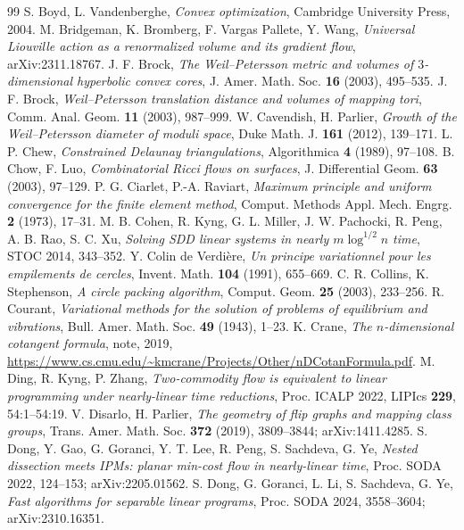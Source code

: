 \documentclass[11pt]{amsart}
\theoremstyle{definition}
\theoremstyle{remark}
\begin{document}
\begin{thebibliography}{99}
 S. Boyd, L. Vandenberghe, \emph{Convex optimization}, Cambridge University Press, 2004.
 M. Bridgeman, K. Bromberg, F. Vargas Pallete, Y. Wang, \emph{Universal Liouville action as a renormalized volume and its gradient flow}, arXiv:2311.18767.
 J. F. Brock, \emph{The Weil--Petersson metric and volumes of $3$-dimensional hyperbolic convex cores}, J. Amer. Math. Soc. \textbf{16} (2003), 495--535.
 J. F. Brock, \emph{Weil--Petersson translation distance and volumes of mapping tori}, Comm. Anal. Geom. \textbf{11} (2003), 987--999.
 W. Cavendish, H. Parlier, \emph{Growth of the Weil--Petersson diameter of moduli space}, Duke Math. J. \textbf{161} (2012), 139--171.
 L. P. Chew, \emph{Constrained Delaunay triangulations}, Algorithmica \textbf{4} (1989), 97--108.
 B. Chow, F. Luo, \emph{Combinatorial Ricci flows on surfaces}, J. Differential Geom. \textbf{63} (2003), 97--129.
 P. G. Ciarlet, P.-A. Raviart, \emph{Maximum principle and uniform convergence for the finite element method}, Comput. Methods Appl. Mech. Engrg. \textbf{2} (1973), 17--31.
 M. B. Cohen, R. Kyng, G. L. Miller, J. W. Pachocki, R. Peng, A. B. Rao, S. C. Xu, \emph{Solving SDD linear systems in nearly $m\log^{1/2}n$ time}, STOC 2014, 343--352.
 Y. Colin de Verdi\`ere, \emph{Un principe variationnel pour les empilements de cercles}, Invent. Math. \textbf{104} (1991), 655--669.
 C. R. Collins, K. Stephenson, \emph{A circle packing algorithm}, Comput. Geom. \textbf{25} (2003), 233--256.
 R. Courant, \emph{Variational methods for the solution of problems of equilibrium and vibrations}, Bull. Amer. Math. Soc. \textbf{49} (1943), 1--23.
 K. Crane, \emph{The $n$-dimensional cotangent formula}, note, 2019, \url{https://www.cs.cmu.edu/~kmcrane/Projects/Other/nDCotanFormula.pdf}.
 M. Ding, R. Kyng, P. Zhang, \emph{Two-commodity flow is equivalent to linear programming under nearly-linear time reductions}, Proc. ICALP 2022, LIPIcs \textbf{229}, 54:1--54:19.
 V. Disarlo, H. Parlier, \emph{The geometry of flip graphs and mapping class groups}, Trans. Amer. Math. Soc. \textbf{372} (2019), 3809--3844; arXiv:1411.4285.
 S. Dong, Y. Gao, G. Goranci, Y. T. Lee, R. Peng, S. Sachdeva, G. Ye, \emph{Nested dissection meets IPMs: planar min-cost flow in nearly-linear time}, Proc. SODA 2022, 124--153; arXiv:2205.01562.
 S. Dong, G. Goranci, L. Li, S. Sachdeva, G. Ye, \emph{Fast algorithms for separable linear programs}, Proc. SODA 2024, 3558--3604; arXiv:2310.16351.

\end{thebibliography}
\end{document}
